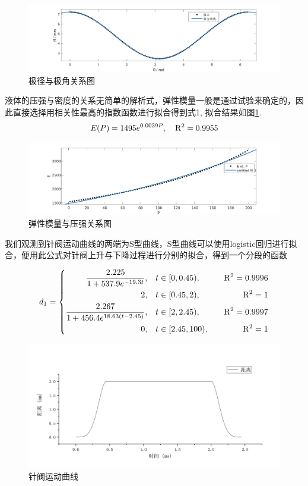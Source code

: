 \documentclass{cumcmthesis}
\newcommand{\f}[2]{\frac{#1}{#2}}
\newcommand{\hua}[1]{\left\{\begin{aligned}
    #1
    \end{aligned}\right.}
\begin{document}
\begin{figure}[htbp]
	\centering
	\includegraphics[width=.8\textwidth]{R_THETA.png}
	\caption{极径与极角关系图}
\end{figure}

液体的压强与密度的关系无简单的解析式，弹性模量一般是通过试验来确定的，因此直接选择用相关性最高的指数函数进行拟合得到式1, 拟合结果如图\ref{EP}. 
\begin{equation}
    E(P) = 1495e^{0.0039P} ,\quad \rm{R}^2 = 0.9955 \label{E} 
\end{equation}

\begin{figure}[htbp]
	\centering
	\includegraphics[width=.8\textwidth]{E_P.pdf}
    \caption{弹性模量与压强关系图}
    \label{EP}
\end{figure}

我们观测到针阀运动曲线的两端为S型曲线，S型曲线可以使用logistic回归进行拟合，便用此公式对针阀上升与下降过程进行分别的拟合，得到一个分段的函数

$$d_1 = \hua{
    \f{2.225}{1+537.9e^{-19.3t}}, &\quad t\in[0,0.45),&\quad \rm{R}^2=0.9996\\
    2,&\quad t\in[0.45,2),&\quad \rm{R}^2=1\\
    \f{2.267}{1+456.4e^{18.63(t-2.45)}}, &\quad t\in[2,2.45),&\quad \rm{R}^2=0.9997\\
    0,&\quad t\in[2.45, 100),&\quad \rm{R}^2=1
}$$

\begin{figure}[htbp]
	\centering
	\includegraphics[width=.7\textwidth]{quan.jpg}
	\caption{针阀运动曲线}
\end{figure}
\end{document}
